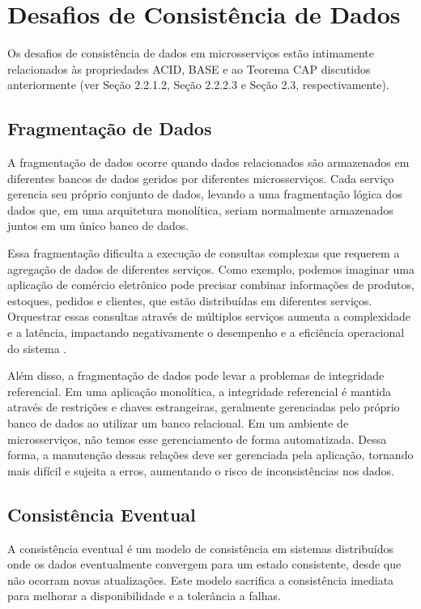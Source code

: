 \section{Desafios de Consistência de Dados}

Os desafios de consistência de dados em microsserviços estão intimamente relacionados às propriedades ACID, BASE e ao Teorema CAP discutidos anteriormente (ver Seção 2.2.1.2, Seção 2.2.2.3 e Seção 2.3, respectivamente).

\subsection{Fragmentação de Dados}

A fragmentação de dados ocorre quando dados relacionados são armazenados em diferentes bancos de dados geridos por diferentes microsserviços. Cada serviço gerencia seu próprio conjunto de dados, levando a uma fragmentação lógica dos dados que, em uma arquitetura monolítica, seriam normalmente armazenados juntos em um único banco de dados.

Essa fragmentação dificulta a execução de consultas complexas que requerem a agregação de dados de diferentes serviços. Como exemplo, podemos imaginar uma aplicação de comércio eletrônico pode precisar combinar informações de produtos, estoques, pedidos e clientes, que estão distribuídas em diferentes serviços. Orquestrar essas consultas através de múltiplos serviços aumenta a complexidade e a latência, impactando negativamente o desempenho e a eficiência operacional do sistema \cite{fowler2015}.

Além disso, a fragmentação de dados pode levar a problemas de integridade referencial. Em uma aplicação monolítica, a integridade referencial é mantida através de restrições e chaves estrangeiras, geralmente gerenciadas pelo próprio banco de dados ao utilizar um banco relacional. Em um ambiente de microsserviços, não temos esse gerenciamento de forma automatizada. Dessa forma, a manutenção dessas relações deve ser gerenciada pela aplicação, tornando mais difícil e sujeita a erros, aumentando o risco de inconsistências nos dados.

\subsection{Consistência Eventual}

A consistência eventual é um modelo de consistência em sistemas distribuídos onde os dados eventualmente convergem para um estado consistente, desde que não ocorram novas atualizações. Este modelo sacrifica a consistência imediata para melhorar a disponibilidade e a tolerância a falhas.

